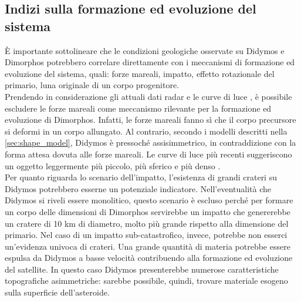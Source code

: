 \documentclass[a4paper,11pt,openright]{book}
\begin{document}
\subsection{Indizi sulla formazione ed evoluzione del sistema}
È importante sottolineare che le condizioni geologiche osservate su Didymos e Dimorphos potrebbero correlare direttamente con i meccanismi di formazione ed evoluzione del sistema, quali: forze mareali, impatto, effetto rotazionale del primario, luna originale di un corpo progenitore.\\
Prendendo in considerazione gli attuali dati radar \citep{naidu_radar_2020} e le curve di luce \citep{pravec_binary_2016}, è possibile escludere le forze mareali come meccanismo rilevante per la formazione ed evoluzione di Dimorphos. Infatti, le forze mareali fanno sì che il corpo precursore si deformi in un corpo allungato. Al contrario, secondo i modelli descritti nella \cref{sec:shape_model}, Didymos è pressoché assisimmetrico, in contraddizione con la forma attesa dovuta alle forze mareali. Le curve di luce più recenti suggeriscono un oggetto leggermente più piccolo, più sferico e più denso \citep{pravec_photometric_2022}.\\
Per quanto riguarda lo scenario dell'impatto, l'esistenza di grandi crateri su Didymos potrebbero esserne un potenziale indicatore. Nell'eventualità che Didymos si riveli essere monolitico, questo scenario è escluso perché per formare un corpo delle dimensioni di Dimorphos servirebbe un impatto che genererebbe un cratere di 10 km di diametro, molto più grande rispetto alla dimensione del primario. Nel caso di un impatto sub-catastrofico, invece, potrebbe non esserci un'evidenza univoca di crateri. Una grande quantità di materia potrebbe essere espulsa da Didymos a basse velocità contribuendo alla formazione ed evoluzione del satellite. In questo caso Didymos presenterebbe numerose caratteristiche topografiche asimmetriche: sarebbe possibile, quindi, trovare materiale esogeno sulla superficie dell'asteroide.\\
\end{document}

